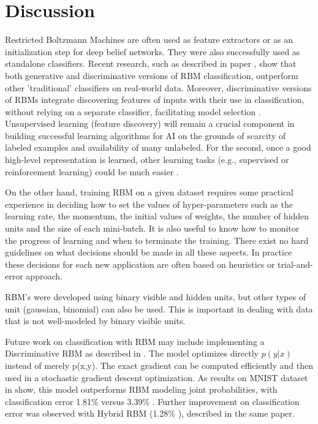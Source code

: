 \documentclass[a4paper]{scrartcl}
\begin{document}
\section{Discussion}
Restricted Boltzmann Machines are often used as feature extractors or as an initialization step for deep belief networks. They were also successfully used as standalone classifiers. Recent research, such as described in paper \cite{Schmah}, show that both generative and discriminative versions of RBM classification, outperform other 'traditional' classifiers on real-world data. Moreover, discriminative versions of RBMs integrate discovering features of inputs with their use in classification, without relying on a separate classifier, facilitating model selection \cite{Larochelle}. Unsupervised learning (feature discovery) will remain a crucial component in building successful learning algorithms for AI on the grounds of scarcity of labeled examples and availability of many unlabeled. For the second, once a good high-level representation is learned, other learning tasks (e.g., supervised or reinforcement learning) could be much easier \cite{Bengio}. 
\par On the other hand, training RBM on a given dataset requires some practical experience in deciding how to set the values of hyper-parameters such as the learning rate, the momentum, the initial values of weights, the number of hidden units and the size of each mini-batch. It is also useful to know how to monitor the progress of learning and when to terminate the training. There exist no hard guidelines on what decisions should be made in all these aspects. In practice these decisions for each new application are often based on heuristics or trial-and-error approach. 
\par RBM's were developed using binary visible and hidden units, but other types of unit (gaussian, binomial) can also be used. This is important in dealing with data that is not well-modeled by binary visible units. 
\par Future work on classification with RBM may include implementing a Discriminative RBM as described in \cite{Larochelle}. The model optimizes directly $p(y \vert x)$ instead of merely p(x,y). The exact gradient can be computed efficiently and then used in a stochastic gradient descent optimization. As results on MNIST dataset in \cite{Larochelle} show, this model outperforms RBM modeling joint probabilities, with classification error 1.81\% versus 3.39\% . Further improvement on classification error was observed with Hybrid RBM (1.28\% ), described in the same paper.
\end{document}
